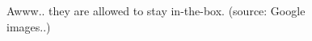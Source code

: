 \documentclass[11pt]{article}
\begin{document}
\begin{figure}[H]
\begin{subfigure}[b]{0.32\textwidth}
	\end{subfigure}
	\caption{Awww.. they are allowed to stay in-the-box. (source: Google images..)}
	\label{fig:cat-in-the-box}
\end{figure}



\printbibliography[heading=bibintoc] %
\end{document}
